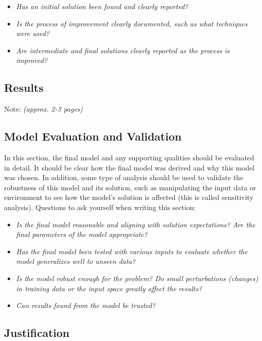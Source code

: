 \documentclass{article}
\begin{document}
\begin{itemize}
\item
  \emph{Has an initial solution been found and clearly reported?}
\item
  \emph{Is the process of improvement clearly documented, such as what
  techniques were used?}
\item
  \emph{Are intermediate and final solutions clearly reported as the
  process is improved?}
\end{itemize}

\subsection{Results}\label{kaggleresults}

Note: \emph{(approx. 2-3 pages)}

\subsection{Model Evaluation and
Validation}\label{model-evaluation-and-validation}

In this section, the final model and any supporting qualities should be
evaluated in detail. It should be clear how the final model was derived
and why this model was chosen. In addition, some type of analysis should
be used to validate the robustness of this model and its solution, such
as manipulating the input data or environment to see how the model's
solution is affected (this is called sensitivity analysis). Questions to
ask yourself when writing this section:

\begin{itemize}
\item
  \emph{Is the final model reasonable and aligning with solution
  expectations? Are the final parameters of the model appropriate?}
\item
  \emph{Has the final model been tested with various inputs to evaluate
  whether the model generalizes well to unseen data?}
\item
  \emph{Is the model robust enough for the problem? Do small
  perturbations (changes) in training data or the input space greatly
  affect the results?}
\item
  \emph{Can results found from the model be trusted?}
\end{itemize}

\subsection{Justification}\label{justification}
\end{document}
